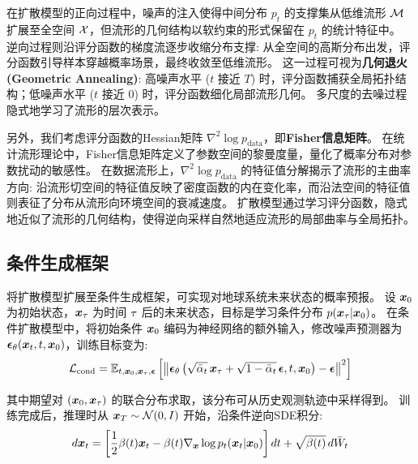 在扩散模型的正向过程中，噪声的注入使得中间分布 $p_t$ 的支撑集从低维流形 $\mathcal{M}$ 扩展至全空间 $\mathcal{X}$，但流形的几何结构以软约束的形式保留在 $p_t$ 的统计特征中。
逆向过程则沿评分函数的梯度流逐步收缩分布支撑: 从全空间的高斯分布出发，评分函数引导样本穿越概率场景，最终收敛至低维流形。
这一过程可视为\textbf{几何退火 (Geometric Annealing)}: 高噪声水平 ($t$ 接近 $T$) 时，评分函数捕获全局拓扑结构；低噪声水平 ($t$ 接近 $0$) 时，评分函数细化局部流形几何。
多尺度的去噪过程隐式地学习了流形的层次表示。

另外，我们考虑评分函数的Hessian矩阵 $\nabla^2 \log p_{\text{data}}$，即\textbf{Fisher信息矩阵}。
在统计流形理论中，Fisher信息矩阵定义了参数空间的黎曼度量，量化了概率分布对参数扰动的敏感性。
在数据流形上，$\nabla^2 \log p_{\text{data}}$ 的特征值分解揭示了流形的主曲率方向: 沿流形切空间的特征值反映了密度函数的内在变化率，而沿法空间的特征值则表征了分布从流形向环境空间的衰减速度。
扩散模型通过学习评分函数，隐式地近似了流形的几何结构，使得逆向采样自然地适应流形的局部曲率与全局拓扑。

\subsection{条件生成框架}

将扩散模型扩展至条件生成框架，可实现对地球系统未来状态的概率预报。
设 $\bm{x}_0$ 为初始状态，$\bm{x}_{\tau}$ 为时间 $\tau$ 后的未来状态，目标是学习条件分布 $p(\bm{x}_{\tau}|\bm{x}_0)$。
在条件扩散模型中，将初始条件 $\bm{x}_0$ 编码为神经网络的额外输入，修改噪声预测器为 $\bm{\epsilon}_\theta(\bm{x}_t, t, \bm{x}_0)$，训练目标变为:
\begin{equation}
\label{eq:conditional_diffusion}
    \mathcal{L}_{\text{cond}} = \mathbb{E}_{t, \bm{x}_0, \bm{x}_{\tau}, \bm{\epsilon}}\left[\left\|\bm{\epsilon}_\theta\left(\sqrt{\bar{\alpha}_t}\,\bm{x}_{\tau} + \sqrt{1-\bar{\alpha}_t}\,\bm{\epsilon}, t, \bm{x}_0\right) - \bm{\epsilon}\right\|^2\right]
\end{equation}

其中期望对 $(\bm{x}_0, \bm{x}_{\tau})$ 的联合分布求取，该分布可从历史观测轨迹中采样得到。
训练完成后，推理时从 $\bm{x}_T \sim \mathcal{N}(0, I)$ 开始，沿条件逆向SDE积分:
\begin{equation}
\label{eq:conditional_reverse}
    d\bm{x}_t = \left[\frac{1}{2}\beta(t)\bm{x}_t - \beta(t)\nabla_{\bm{x}} \log p_t(\bm{x}_t|\bm{x}_0)\right]dt + \sqrt{\beta(t)}\,d\bar{W}_t
\end{equation}

